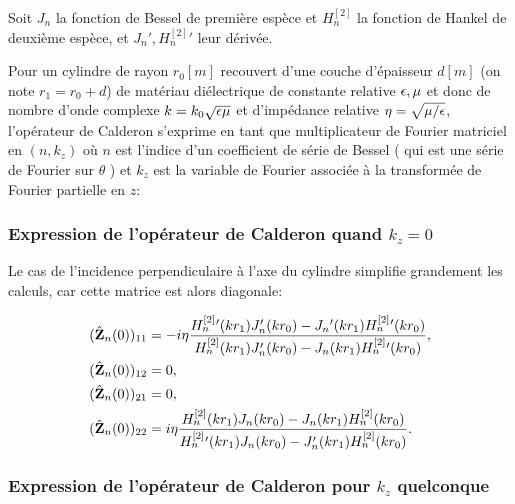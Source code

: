 
            Soit \(J_n\) la fonction de Bessel de première espèce et \(H_n^{[2]}\) la fonction de Hankel de deuxième espèce, et \(J_n', H_n^{[2]}{}'\) leur dérivée.
    
            Pour un cylindre de rayon \(r_0 [m]\) recouvert d'une couche d'épaisseur \(d [m]\) (on note \(r_1=r_0 + d\)) de matériau diélectrique de constante relative \(\epsilon,\mu\) et donc de nombre d'onde complexe \(k = k_0\sqrt{\epsilon\mu}\) et d'impédance relative \(\eta=\sqrt{{\mu}/{\epsilon}}\), l'opérateur de Calderon s'exprime en tant que multiplicateur de Fourier matriciel en \((n,k_z)\) où \(n\) est l'indice d'un coefficient de série de Bessel ( qui est une série de Fourier sur \(\theta\) ) et \(k_z\) est la variable de Fourier associée à la transformée de Fourier partielle en \(z\):

            \subsubsection{Expression de l'opérateur de Calderon quand \(k_z=0\)}
              Le cas de l'incidence perpendiculaire à l'axe du cylindre simplifie grandement les calculs, car cette matrice est alors diagonale:

              \begin{align*}
                (\hat{\mathbf{Z}}_n(0))_{11} &= -i\eta\dfrac{
                  H^{[2]}_n{}'(kr_1)J_n'(kr_0)-J_n{}'(kr_1)H^{[2]}_n{}'(kr_0)
                }{
                  H^{[2]}_n(kr_1)J_n'(kr_0)-J_n(kr_1)H^{[2]}_n{}'(kr_0)
                },
                \\
                (\hat{\mathbf{Z}}_n(0))_{12} &= 0,
                \\
                (\hat{\mathbf{Z}}_n(0))_{21} &= 0,
                \\
                (\hat{\mathbf{Z}}_n(0))_{22} &=i\eta\dfrac{
                    H^{[2]}_n(kr_1)J_n(kr_0)-J_n(kr_1)H^{[2]}_n(kr_0)
                  }{
                    H^{[2]}_n{}'(kr_1)J_n(kr_0)-J_n'(kr_1)H^{[2]}_n(kr_0)
                  }.
              \end{align*}

            \subsubsection{Expression de l'opérateur de Calderon pour \(k_z\) quelconque}

